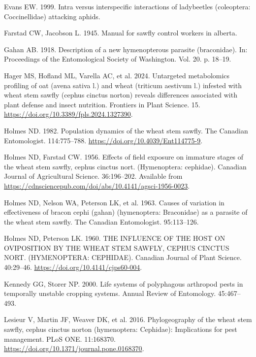 \documentclass[
]{article}
\newlength{\cslhangindent}
\newenvironment{CSLReferences}[2] %
 {\begin{list}{}{%
  \setlength{\itemindent}{0pt}
  \setlength{\leftmargin}{0pt}
  \setlength{\parsep}{0pt}
  \ifodd #1
   \setlength{\leftmargin}{\cslhangindent}
   \setlength{\itemindent}{-1\cslhangindent}
  \fi
  \setlength{\itemsep}{#2\baselineskip}}}
 {\end{list}}
\begin{document}
\begin{CSLReferences}{0}{1}
Evans EW. 1999. Intra versus interspecific interactions of ladybeetles
(coleoptera: Coccinellidae) attacking aphids.

Farstad CW, Jacobson L. 1945. Manual for sawfly control workers in
alberta.

Gahan AB. 1918. Description of a new hymenopterous parasite
(braconidae). In: Proceedings of the Entomological Society of
Washington. Vol. 20. p. 18--19.

Hager MS, Hofland ML, Varella AC, et al. 2024. Untargeted metabolomics
profiling of oat (avena sativa l.) and wheat (triticum aestivum l.)
infested with wheat stem sawfly (cephus cinctus norton) reveals
differences associated with plant defense and insect nutrition.
Frontiers in Plant Science. 15.
\url{https://doi.org/10.3389/fpls.2024.1327390}.

Holmes ND. 1982. Population dynamics of the wheat stem sawfly. The
Canadian Entomologist. 114:775--788.
\url{https://doi.org/10.4039/Ent114775-9}.

Holmes ND, Farstad CW. 1956. Effects of field exposure on immature
stages of the wheat stem sawfly, cephus cinctus nort. (Hymenoptera:
cephidae). Canadian Journal of Agricultural Science. 36:196--202.
Available from
\url{https://cdnsciencepub.com/doi/abs/10.4141/agsci-1956-0023}.

Holmes ND, Nelson WA, Peterson LK, et al. 1963. Causes of variation in
effectiveness of bracon cephi (gahan) (hymenoptera: Braconidae) as a
parasite of the wheat stem sawfly. The Canadian Entomologist.
95:113--126.

Holmes ND, Peterson LK. 1960. THE INFLUENCE OF THE HOST ON OVIPOSITION
BY THE WHEAT STEM SAWFLY, CEPHUS CINCTUS NORT. (HYMENOPTERA: CEPHIDAE).
Canadian Journal of Plant Science. 40:29--46.
\url{https://doi.org/10.4141/cjps60-004}.

Kennedy GG, Storer NP. 2000. Life systems of polyphagous arthropod pests
in temporally unstable cropping systems. Annual Review of Entomology.
45:467--493.

Lesieur V, Martin JF, Weaver DK, et al. 2016. Phylogeography of the
wheat stem sawfly, cephus cinctus norton (hymenoptera: Cephidae):
Implications for pest management. PLoS ONE. 11:168370.
\url{https://doi.org/10.1371/journal.pone.0168370}.


\end{CSLReferences}
\end{document}
